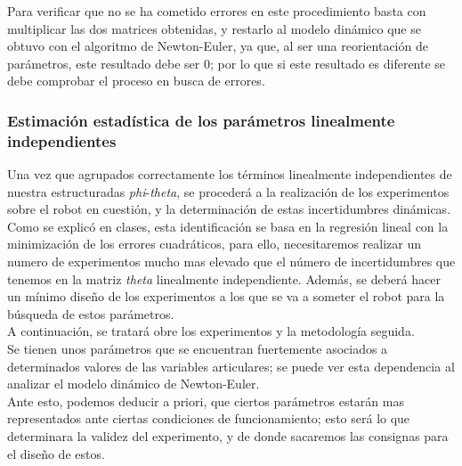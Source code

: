 Para verificar que no se ha cometido errores en este procedimiento basta con multiplicar las dos matrices obtenidas, y restarlo al modelo dinámico que se obtuvo con el algoritmo de Newton-Euler, ya que, al ser una reorientación de parámetros, este resultado debe ser 0; por lo que si este resultado es diferente se debe comprobar el proceso en busca de errores.


	\newpage
	\subsubsection{Estimación estadística de los parámetros linealmente independientes}
	Una vez que agrupados correctamente los términos linealmente independientes de nuestra estructuradas
	\textit{phi}-\textit{theta}, se procederá a la realización de los experimentos sobre
	el robot en cuestión, y la determinación de estas incertidumbres dinámicas.\\

	Como se explicó en clases, esta identificación se basa en la regresión lineal con la minimización de los
	errores cuadráticos, para ello, necesitaremos realizar un numero de experimentos mucho mas elevado que el número
	de incertidumbres que tenemos en la matriz \textit{theta} linealmente independiente. Además, se deberá hacer
	un mínimo diseño de los experimentos a los que se va a someter el robot para la búsqueda de estos parámetros.\\

	A continuación, se tratará obre los experimentos y la metodología seguida.\\
	Se tienen unos parámetros que se encuentran fuertemente asociados a determinados valores de las variables articulares; se puede ver esta dependencia al analizar el modelo dinámico de Newton-Euler.\\
	Ante esto, podemos deducir a priori, que ciertos parámetros estarán mas representados ante ciertas condiciones de funcionamiento; esto será lo que determinara la validez del experimento, y de donde sacaremos las consignas para el diseño de estos.\\

